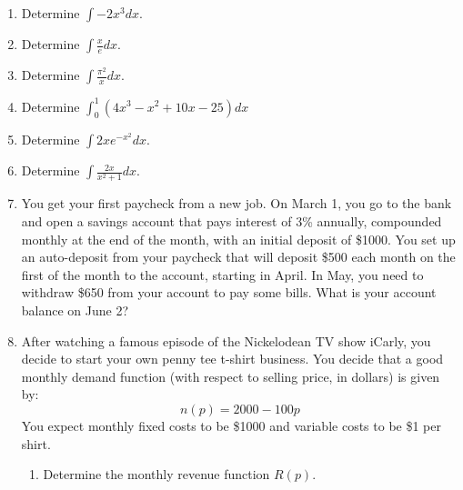 \documentclass[letterpaper,12pt,fleqn]{article}
\begin{document}
\begin{enumerate}[left=0pt]
\item Determine \(\displaystyle\int-2x^3dx\).

  \vspace{1.5in}

\item Determine \(\displaystyle\int\frac{x}{e}dx\).

  \vspace{1.5in}

\item Determine \(\displaystyle\int\frac{\pi^2}{x}dx\).

  \vspace{1.5in}

\item Determine \(\displaystyle\int_0^1(4x^3-x^2+10x-25)dx\)

  \newpage

\item Determine \(\displaystyle\int{2xe^{-x^2}}dx\).

  \vspace{4in}

\item Determine \(\displaystyle\int\frac{2x}{x^2+1}dx\).

  \newpage

\item You get your first paycheck from a new job.  On March 1, you go to the bank and open a savings account that pays interest
  of 3\% annually, compounded monthly at the end of the month, with an initial deposit of \$1000.  You set up an auto-deposit
  from your paycheck that will deposit \$500 each month on the first of the month to the account, starting in April.  In May,
  you need to withdraw \$650 from your account to pay some bills.  What is your account balance on June 2?

  \newpage

\item After watching a famous episode of the Nickelodean TV show iCarly, you decide to start your own penny tee t-shirt
  business.  You decide that a good monthly demand function (with respect to selling price, in dollars) is given by:
  \[n(p)=2000-100p\]
  You expect monthly fixed costs to be \$1000 and variable costs to be \$1 per shirt.
  \begin{enumerate}
  \item Determine the monthly revenue function \(R(p)\).

    \vspace{0.75in}


\end{enumerate}
\end{enumerate}
\end{document}
